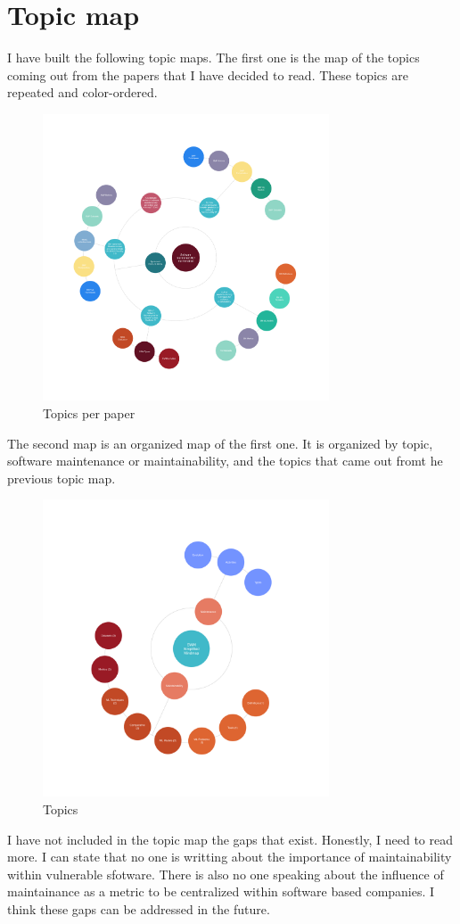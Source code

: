 \documentclass[article]{IEEEtran}
\begin{document}
\section{Topic map}
I have built the following topic maps. The first one is the map of the topics coming out from the papers that I have decided to read. These topics are repeated and color-ordered.

\begin{figure}[htp]
    \centering
    \includegraphics[width=8.5cm]{topics_per_paper.png}
    \caption{Topics per paper}
    \label{fig:topicspp}
\end{figure}

The second map is an organized map of the first one. It is organized by topic, software maintenance or maintainability, and the topics that came out fromt he previous topic map.

\begin{figure}[htp]
    \centering
    \includegraphics[width=8.5cm]{topics.png}
    \caption{Topics}
    \label{fig:topics}
\end{figure}

I have not included in the topic map the gaps that exist. Honestly, I need to read more. I can state that no one is writting about the importance of maintainability within vulnerable sfotware. There is also no one speaking about the influence of maintainance as a metric to be centralized within software based companies. I think these gaps can be addressed in the future.



\end{document}
